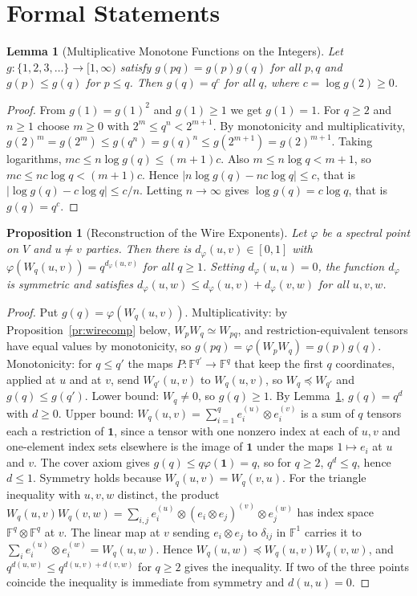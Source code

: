 \documentclass[11pt,letterpaper]{report}
\theoremstyle{plain}
\newtheorem{proposition}[theorem]{Proposition}
\newtheorem{lemma}[theorem]{Lemma}
\theoremstyle{definition}
\theoremstyle{remark}
\begin{document}
\section{Formal Statements}

\begin{lemma}[Multiplicative Monotone Functions on the Integers]\label{lem:powerfn}
Let $g:\{1,2,3,\dots\}\to[1,\infty)$ satisfy $g(pq)=g(p)g(q)$ for all $p,q$ and $g(p)\le g(q)$ for $p\le q$. Then $g(q)=q^{c}$ for all $q$, where $c=\log g(2)\ge0$.
\end{lemma}
\begin{proof}
From $g(1)=g(1)^2$ and $g(1)\ge1$ we get $g(1)=1$. For $q\ge2$ and $n\ge1$ choose $m\ge0$ with $2^m\le q^n<2^{m+1}$. By monotonicity and multiplicativity, $g(2)^m=g(2^m)\le g(q^n)=g(q)^n\le g(2^{m+1})=g(2)^{m+1}$. Taking logarithms, $mc\le n\log g(q)\le(m+1)c$. Also $m\le n\log q<m+1$, so $mc\le nc\log q<(m+1)c$. Hence $|n\log g(q)-nc\log q|\le c$, that is $|\log g(q)-c\log q|\le c/n$. Letting $n\to\infty$ gives $\log g(q)=c\log q$, that is $g(q)=q^c$.
\end{proof}

\begin{proposition}[Reconstruction of the Wire Exponents]\label{pr:wireexp}
Let $\varphi$ be a spectral point on $V$ and $u\ne v$ parties. Then there is $d_\varphi(u,v)\in[0,1]$ with $\varphi(W_q(u,v))=q^{d_\varphi(u,v)}$ for all $q\ge1$. Setting $d_\varphi(u,u)=0$, the function $d_\varphi$ is symmetric and satisfies $d_\varphi(u,w)\le d_\varphi(u,v)+d_\varphi(v,w)$ for all $u,v,w$.
\end{proposition}
\begin{proof}
Put $g(q)=\varphi(W_q(u,v))$. Multiplicativity: by Proposition~\ref{pr:wirecomp} below, $W_pW_q\simeq W_{pq}$, and restriction-equivalent tensors have equal values by monotonicity, so $g(pq)=\varphi(W_pW_q)=g(p)g(q)$. Monotonicity: for $q\le q'$ the maps $P:\mathbb F^{q'}\to\mathbb F^q$ that keep the first $q$ coordinates, applied at $u$ and at $v$, send $W_{q'}(u,v)$ to $W_q(u,v)$, so $W_q\preceq W_{q'}$ and $g(q)\le g(q')$. Lower bound: $W_q\ne0$, so $g(q)\ge1$. By Lemma~\ref{lem:powerfn}, $g(q)=q^d$ with $d\ge0$. Upper bound: $W_q(u,v)=\sum_{i=1}^qe_i^{(u)}\otimes e_i^{(v)}$ is a sum of $q$ tensors each a restriction of $\mathbf 1$, since a tensor with one nonzero index at each of $u,v$ and one-element index sets elsewhere is the image of $\mathbf 1$ under the maps $1\mapsto e_i$ at $u$ and $v$. The cover axiom gives $g(q)\le q\varphi(\mathbf 1)=q$, so for $q\ge2$, $q^d\le q$, hence $d\le1$. Symmetry holds because $W_q(u,v)=W_q(v,u)$. For the triangle inequality with $u,v,w$ distinct, the product $W_q(u,v)W_q(v,w)=\sum_{i,j}e_i^{(u)}\otimes(e_i\otimes e_j)^{(v)}\otimes e_j^{(w)}$ has index space $\mathbb F^q\otimes\mathbb F^q$ at $v$. The linear map at $v$ sending $e_i\otimes e_j$ to $\delta_{ij}$ in $\mathbb F^1$ carries it to $\sum_ie_i^{(u)}\otimes e_i^{(w)}=W_q(u,w)$. Hence $W_q(u,w)\preceq W_q(u,v)W_q(v,w)$, and $q^{d(u,w)}\le q^{d(u,v)+d(v,w)}$ for $q\ge2$ gives the inequality. If two of the three points coincide the inequality is immediate from symmetry and $d(u,u)=0$.
\end{proof}
\end{document}
